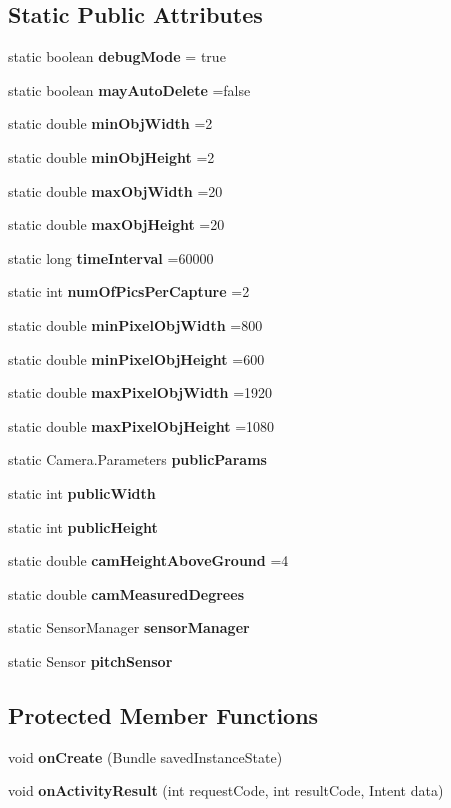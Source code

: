 \subsection*{Static Public Attributes}
\begin{DoxyCompactItemize}
\item 
static boolean {\bf debug\+Mode} = true
\item 
static boolean {\bf may\+Auto\+Delete} =false
\item 
static double {\bf min\+Obj\+Width} =2
\item 
static double {\bf min\+Obj\+Height} =2
\item 
static double {\bf max\+Obj\+Width} =20
\item 
static double {\bf max\+Obj\+Height} =20
\item 
static long {\bf time\+Interval} =60000
\item 
static int {\bf num\+Of\+Pics\+Per\+Capture} =2
\item 
static double {\bf min\+Pixel\+Obj\+Width} =800
\item 
static double {\bf min\+Pixel\+Obj\+Height} =600
\item 
static double {\bf max\+Pixel\+Obj\+Width} =1920
\item 
static double {\bf max\+Pixel\+Obj\+Height} =1080
\item 
static Camera.\+Parameters {\bf public\+Params}
\item 
static int {\bf public\+Width}
\item 
static int {\bf public\+Height}
\item 
static double {\bf cam\+Height\+Above\+Ground} =4
\item 
static double {\bf cam\+Measured\+Degrees}
\item 
static Sensor\+Manager {\bf sensor\+Manager}
\item 
static Sensor {\bf pitch\+Sensor}
\end{DoxyCompactItemize}
\subsection*{Protected Member Functions}
\begin{DoxyCompactItemize}
\item 
void {\bf on\+Create} (Bundle saved\+Instance\+State)
\item 
void {\bf on\+Activity\+Result} (int request\+Code, int result\+Code, Intent data)
\end{DoxyCompactItemize}

